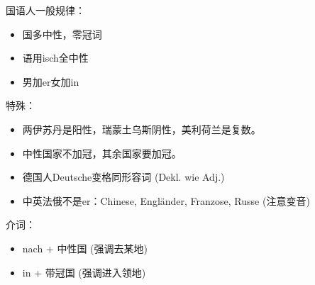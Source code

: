 国语人一般规律：
\begin{itemize}
    \item 国多中性，零冠词
    \item 语用isch全中性
    \item 男加er女加in
\end{itemize}
特殊：
\begin{itemize}
    \item 两伊苏丹是阳性，瑞蒙土乌斯阴性，美利荷兰是复数。
    \item 中性国家不加冠，其余国家要加冠。
    \item 德国人Deutsche变格同形容词 (Dekl. wie Adj.)
    \item 中英法俄不是er：Chinese, Engländer, Franzose, Russe (注意变音)
\end{itemize}
介词：
\begin{itemize}
    \item nach + 中性国 (强调去某地)
    \item in + 带冠国 (强调进入领地)
\end{itemize}

